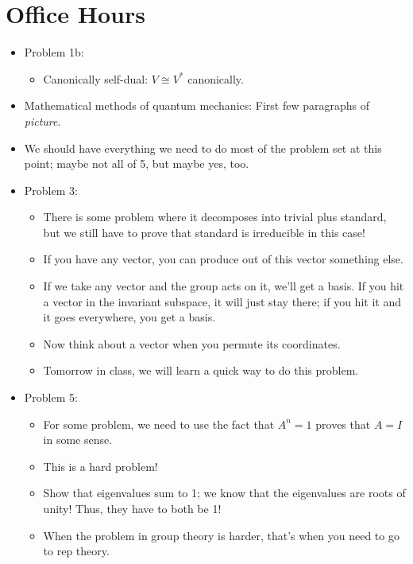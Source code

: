 \documentclass[../notes.tex]{subfiles}
\begin{document}
\section{Office Hours}
\begin{itemize}
    \item {}Problem 1b:
    \begin{itemize}
        \item Canonically self-dual: $V\cong V^*$ canonically.
    \end{itemize}
    \item Mathematical methods of quantum mechanics: First few paragraphs of \emph{picture}.
    \item We should have everything we need to do most of the problem set at this point; maybe not all of 5, but maybe yes, too.
    \item Problem 3:
    \begin{itemize}
        \item There is some problem where it decomposes into trivial plus standard, but we still have to prove that standard is irreducible in this case!
        \item If you have any vector, you can produce out of this vector something else.
        \item If we take any vector and the group acts on it, we'll get a basis. If you hit a vector in the invariant subspace, it will just stay there; if you hit it and it goes everywhere, you get a basis.
        \item Now think about a vector when you permute its coordinates.
        \item Tomorrow in class, we will learn a quick way to do this problem.
    \end{itemize}
    \item Problem 5:
    \begin{itemize}
        \item For some problem, we need to use the fact that $A^n=1$ proves that $A=I$ in some sense.
        \item This is a hard problem!
        \item Show that eigenvalues sum to 1; we know that the eigenvalues are roots of unity! Thus, they have to both be 1!
        \item When the problem in group theory is harder, that's when you need to go to rep theory.
    \end{itemize}
\end{itemize}
\end{document}
